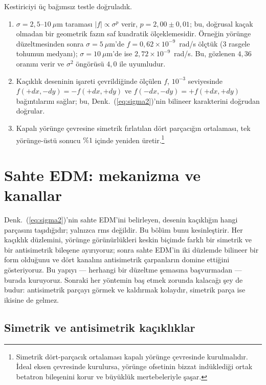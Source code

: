 \documentclass[aps,prab,reprint,superscriptaddress,nofootinbib]{revtex4-2}
\begin{document}
Kestiriciyi üç bağımsız testle doğruladık.
\begin{enumerate}
\item $\sigma = 2{,}5$--$10~\mu$m taraması $|f| \propto \sigma^{p}$ verir,
$p = 2{,}00 \pm 0{,}01$; bu, doğrusal kaçak olmadan bir geometrik fazın saf kuadratik
ölçeklemesidir. Örneğin yörünge düzeltmesinden sonra $\sigma = 5~\mu$m'de
$f = 0{,}62 \times 10^{-9}$~rad/s ölçtük (3 rasgele tohumun medyanı); $\sigma =
10~\mu$m'de ise $2{,}72 \times 10^{-9}$~rad/s. Bu, gözlenen $4{,}36$ oranını verir ve
$\sigma^2$ öngörüsü $4{,}0$ ile uyumludur.
\item Kaçıklık deseninin işareti çevrildiğinde ölçülen $f$, $10^{-3}$ seviyesinde
$f(+dx,-dy) = -f(+dx,+dy)$ ve $f(-dx,-dy) = +f(+dx,+dy)$ bağıntılarını sağlar; bu,
Denk.~(\ref{eq:sigma2})'nin bilineer karakterini doğrudan doğrular.
\item Kapalı yörünge çevresine simetrik fırlatılan dört parçacığın ortalaması, tek
yörünge-üstü sonucu $\%1$ içinde yeniden üretir.\footnote{Simetrik dört-parçacık
ortalaması kapalı yörünge çevresinde kurulmalıdır. İdeal eksen çevresinde kurulursa,
yörünge ofsetinin bizzat indüklediği ortak betatron bileşenini korur ve büyüklük
mertebeleriyle şaşar.}
\end{enumerate}


\section{Sahte EDM: mekanizma ve kanallar}
\label{sec:mechanism}

Denk.~(\ref{eq:sigma2})'nin sahte EDM'ini belirleyen, desenin kaçıklığın hangi
parçasını taşıdığıdır; yalnızca rms değildir. Bu bölüm bunu kesinleştirir. Her
kaçıklık düzlemini, yörünge görünürlükleri keskin biçimde farklı bir simetrik ve
bir antisimetrik bileşene ayırıyoruz; sonra sahte EDM'in iki düzlemde bilineer bir
form olduğunu ve dört kanalını antisimetrik çarpanların domine ettiğini
gösteriyoruz. Bu yapıyı --- herhangi bir düzeltme şemasına başvurmadan --- burada
kuruyoruz. Sonraki her yöntemin baş etmek zorunda kalacağı şey de budur:
antisimetrik parçayı görmek ve kaldırmak kolaydır, simetrik parça ise ikisine de
gelmez.

\subsection{Simetrik ve antisimetrik kaçıklıklar}
\label{sec:symanti}
\end{document}
